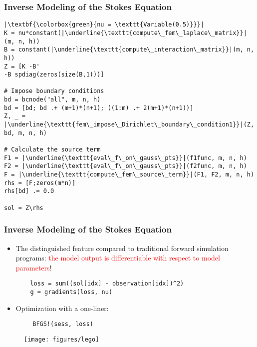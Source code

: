\documentclass[usenames,dvipsnames]{beamer}
\begin{document}
\begin{frame}[fragile]{}
	\frametitle{Inverse Modeling of the Stokes Equation}
	
	\begin{verbatim}
|\textbf{\colorbox{green}{nu = \texttt{Variable(0.5)}}}|
K = nu*constant(|\underline{\texttt{compute\_fem\_laplace\_matrix}}|(m, n, h))
B = constant(|\underline{\texttt{compute\_interaction\_matrix}}|(m, n, h))
Z = [K -B'
-B spdiag(zeros(size(B,1)))]

# Impose boundary conditions
bd = bcnode("all", m, n, h)
bd = [bd; bd .+ (m+1)*(n+1); ((1:m) .+ 2(m+1)*(n+1))]
Z, _ = |\underline{\texttt{fem\_impose\_Dirichlet\_boundary\_condition1}}|(Z, bd, m, n, h)

# Calculate the source term 
F1 = |\underline{\texttt{eval\_f\_on\_gauss\_pts}}|(f1func, m, n, h)
F2 = |\underline{\texttt{eval\_f\_on\_gauss\_pts}}|(f2func, m, n, h)
F = |\underline{\texttt{compute\_fem\_source\_term}}|(F1, F2, m, n, h)
rhs = [F;zeros(m*n)]
rhs[bd] .= 0.0

sol = Z\rhs 
	\end{verbatim}
	
	
\end{frame}



\begin{frame}[fragile]{}
	\frametitle{Inverse Modeling of the Stokes Equation}
	
	\begin{itemize}
		\item The distinguished feature compared to traditional forward simulation programs: \textcolor{red}{the model output is differentiable with respect to model parameters}!
		\begin{verbatim}
	loss = sum((sol[idx] - observation[idx])^2)
	g = gradients(loss, nu)
		\end{verbatim}
		\item Optimization with a one-liner:	 
	\end{itemize}

\begin{verbatim}
	    BFGS!(sess, loss)
\end{verbatim}
	
	\begin{figure}[hbt]
		\centering
		\texttt{[image: figures/lego]}
	\end{figure}
	
\end{frame}
\end{document}
